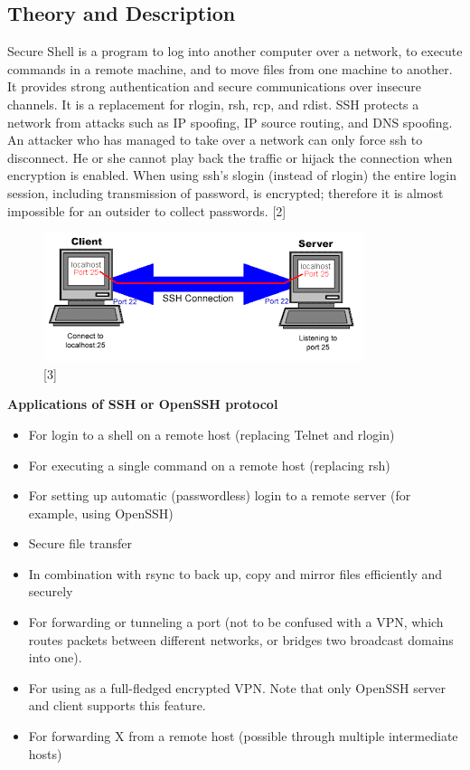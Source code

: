 \documentclass[11pt,a4paper]{report}
\begin{document}
\begin{flushleft}
	\section{Theory and Description}
	Secure Shell is a program to log into another computer over a network, to execute commands in a remote machine, and to move files from one machine to another. It provides strong authentication and secure communications over insecure channels. It is a replacement for rlogin, rsh, rcp, and rdist.
	SSH protects a network from attacks such as IP spoofing, IP source routing, and DNS spoofing. An attacker who has managed to take over a network can only force ssh to disconnect. He or she cannot play back the traffic or hijack the connection when encryption is enabled.
	When using ssh's slogin (instead of rlogin) the entire login session, including transmission of password, is encrypted; therefore it is almost impossible for an outsider to collect passwords. [2]
	\begin{figure}[h!]
		\includegraphics[scale=0.8]{ssh.png}
		\centering
		\caption{[3]}
	\end{figure}
	\textbf{Applications of SSH or OpenSSH protocol}
	\begin{itemize}
		\item For login to a shell on a remote host (replacing Telnet and rlogin)
		\item For executing a single command on a remote host (replacing rsh)
		\item For setting up automatic (passwordless) login to a remote server (for example, using OpenSSH)
		\item Secure file transfer
		\item In combination with rsync to back up, copy and mirror files efficiently and securely
		\item For forwarding or tunneling a port (not to be confused with a VPN, which routes packets between different networks, or bridges two broadcast domains into one).
		\item For using as a full-fledged encrypted VPN. Note that only OpenSSH server and client supports this feature.
		\item For forwarding X from a remote host (possible through multiple intermediate hosts)

\end{itemize}
\end{flushleft}
\end{document}
